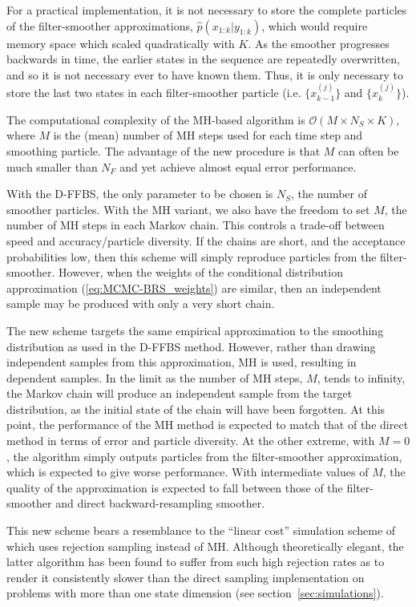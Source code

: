 \documentclass[10pt,twocolumn,twoside]{IEEEtran}
\begin{document}
For a practical implementation, it is not necessary to store the complete particles of the filter-smoother approximations, $\hat{p}(x_{1:k}|y_{1:k})$, which would require memory space which scaled quadratically with $K$. As the smoother progresses backwards in time, the earlier states in the sequence are repeatedly overwritten, and so it is not necessary ever to have known them. Thus, it is only necessary to store the last two states in each filter-smoother particle (i.e. $\{x_{k-1}^{(j)}\}$ and $\{x_{k}^{(j)}\}$).

The computational complexity of the MH-based algorithm is $\mathcal{O}(M \times N_S \times K)$, where $M$ is the (mean) number of MH steps used for each time step and smoothing particle. The advantage of the new procedure is that $M$ can often be much smaller than $N_F$ and yet achieve almost equal error performance.

With the D-FFBS, the only parameter to be chosen is $N_S$, the number of smoother particles. With the MH variant, we also have the freedom to set $M$, the number of MH steps in each Markov chain. This controls a trade-off between speed and accuracy/particle diversity. If the chains are short, and the acceptance probabilities low, then this scheme will simply reproduce particles from the filter-smoother. However, when the weights of the conditional distribution approximation (\ref{eq:MCMC-BRS_weights}) are similar, then an independent sample may be produced with only a very short chain.

The new scheme targets the same empirical approximation to the smoothing distribution as used in the D-FFBS method. However, rather than drawing independent samples from this approximation, MH is used, resulting in dependent samples.  In the limit as the number of MH steps, $M$, tends to infinity, the Markov chain will produce an independent sample from the target distribution, as the initial state of the chain will have been forgotten. At this point, the performance of the MH method is expected to match that of the direct method in terms of error and particle diversity. At the other extreme, with $M=0$, the algorithm simply outputs particles from the filter-smoother approximation, which is expected to give worse performance. With intermediate values of $M$, the quality of the approximation is expected to fall between those of the filter-smoother and direct backward-resampling smoother.

This new scheme bears a resemblance to the ``linear cost'' simulation scheme of \cite{Douc2009} which uses rejection sampling instead of MH. Although theoretically elegant, the latter algorithm has been found to suffer from such high rejection rates as to render it consistently slower than the direct sampling implementation on problems with more than one state dimension (see section~\ref{sec:simulations}).
\end{document}
